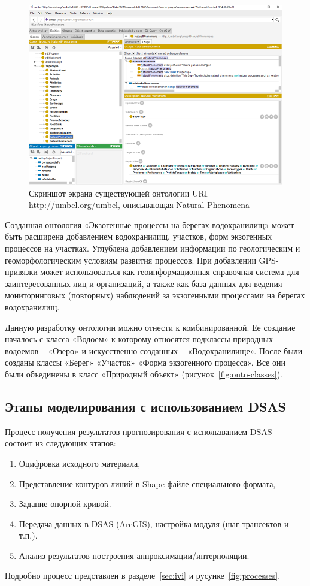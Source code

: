 \documentclass[732,fontsize=14pt,final]{studrep}
\begin{document}
  \begin{figure}[htp]
	\centering
	\includegraphics[width=0.9\linewidth]{pics/image14.png}
    \caption{Скриншот экрана существующей онтологии URI http://umbel.org/umbel, описывающая Natural Phenomena}
    \label{fig:umbel}
  \end{figure}

Созданная онтология «Экзогенные процессы на берегах водохранилищ» может быть расширена добавлением водохранилищ, участков, форм экзогенных процессов на участках. Углублена добавлением информации по геологическим и геоморфологическим условиям развития процессов. При добавлении GPS-привязки может использоваться как геоинформационная справочная система для заинтересованных лиц и организаций, а также как база данных для ведения мониторинговых (повторных) наблюдений за экзогенными процессами на берегах водохранилищ.

Данную разработку онтологии можно отнести к комбинированной. Ее создание началось с класса «Водоем» к которому относятся подклассы природных водоемов – «Озеро» и искусственно созданных – «Водохранилище». После были созданы классы «Берег» «Участок» «Форма экзогенного процесса». Все они были объединены в класс «Природный объект» (рисунок~\ref{fig:onto-classes}).

\subsection{Этапы моделирования с использованием DSAS}
\label{sec:model-stages}

Процесс получения результатов прогнозирования с использванием DSAS~\cite{isha20} состоит из следующих этапов:
\begin{enumerate}
\item Оцифровка исходного материала,
\item Представление контуров линий в Shape-файле специального формата,
\item Задание опорной кривой.
\item Передача данных в DSAS (ArcGIS), настройка модуля (шаг трансектов и т.п.).
\item Анализ результатов построения аппроксимации/интерполяции.
\end{enumerate}
Подробно процесс представлен в разделе~\ref{sec:ivi} и русунке~\ref{fig:processes}.
\end{document}
